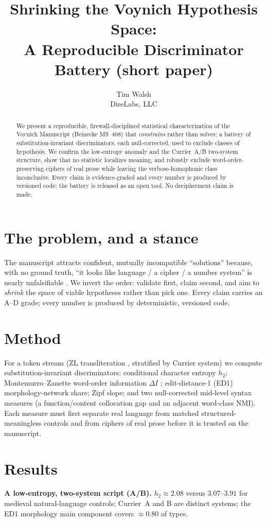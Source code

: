\documentclass[11pt]{article}
\title{\textbf{Shrinking the Voynich Hypothesis Space:\\
A Reproducible Discriminator Battery (short paper)}}
\author{Tim Walsh \\ \small DireLabs, LLC}
\date{}
\begin{document}
\maketitle

\begin{abstract}
\noindent We present a reproducible, firewall-disciplined statistical characterization of the
Voynich Manuscript (Beinecke MS~408) that \emph{constrains} rather than solves: a battery of
substitution-invariant discriminators, each null-corrected, used to exclude classes of
hypothesis. We confirm the low-entropy anomaly and the Currier~A/B two-system structure, show
that no statistic localizes meaning, and robustly exclude word-order-preserving ciphers of real
prose while leaving the verbose-homophonic class inconclusive. Every claim is evidence-graded and
every number is produced by versioned code; the battery is released as an open tool. No
decipherment claim is made.
\end{abstract}

\section{The problem, and a stance}
The manuscript attracts confident, mutually incompatible ``solutions'' because, with no ground
truth, ``it looks like language / a cipher / a number system'' is nearly unfalsifiable
\citep{bowern2021linguistics}. We invert the order: validate first, claim second, and aim to
\emph{shrink} the space of viable hypotheses rather than pick one. Every claim carries an A--D
grade; every number is produced by deterministic, versioned code.

\section{Method}
For a token stream (ZL transliteration \citep{zandbergen_voynichnu}, stratified by Currier
system) we compute substitution-invariant discriminators: conditional character entropy $h_2$;
Montemurro--Zanette word-order information $\Delta I$ \citep{montemurro2013keywords};
edit-distance-1 (ED1) morphology-network share; Zipf slope; and two null-corrected mid-level
syntax measures (a function/content collocation gap and an adjacent word-class NMI). Each measure
must first separate real language from matched structured-meaningless controls and from ciphers of
real prose before it is trusted on the manuscript.

\section{Results}
\textbf{A low-entropy, two-system script (A/B).} $h_2\approx 2.08$ versus $3.07$--$3.91$ for
medieval natural-language controls; Currier~A and B are distinct systems; the ED1 morphology main
component covers $\approx 0.80$ of types.
\end{document}
